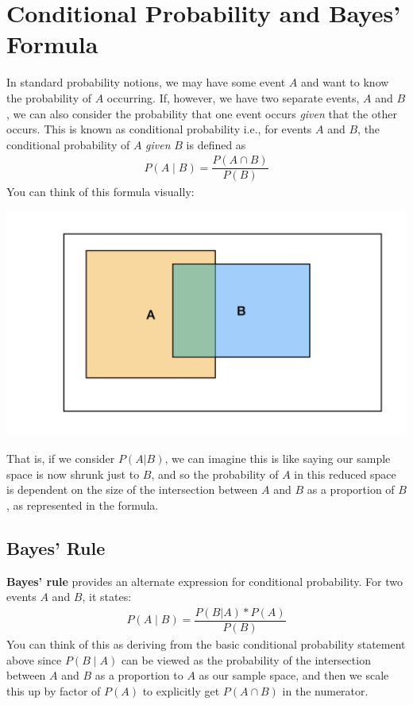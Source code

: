 \documentclass[10pt,a4paper]{article}
\begin{document}
\section{Conditional Probability and Bayes' Formula}

In standard probability notions, we may have some event $A$ and want to know the probability of $A$ occurring. If, however, we have two separate events, $A$ and $B$, we can also consider the probability that one event occurs \textit{given} that the other occurs. This is known as conditional probability i.e., for events $A$ and $B$, the conditional probability of $A$ \textit{given} $B$ is defined as 
\begin{align*}
    P(A \mid B) = \dfrac{P(A \cap B)}{P(B)}
\end{align*}
You can think of this formula visually: 
\begin{center}
    \includegraphics[scale=0.1]{diagrams/prob_diagrams/prob_diagrams.001.png}
\end{center}
That is, if we consider $P(A | B)$, we can imagine this is like saying our sample space is now shrunk just to $B$, and so the probability of $A$ in this reduced space is dependent on the size of the intersection between $A$ and $B$ as a proportion of $B$, as represented in the formula.

\subsection{Bayes' Rule}

\textbf{Bayes' rule} provides an alternate expression for conditional probability. For two events $A$ and $B$, it states: 
\begin{align*}
    P(A \mid B) = \dfrac{P(B|A) * P(A)}{P(B)}
\end{align*}
You can think of this as deriving from the basic conditional probability statement above since $P(B \mid A)$ can be viewed as the probability of the intersection between $A$ and $B$ as a proportion to $A$ as our sample space, and then we scale this up by factor of $P(A)$ to explicitly get $P(A \cap B)$ in the numerator.
\end{document}
